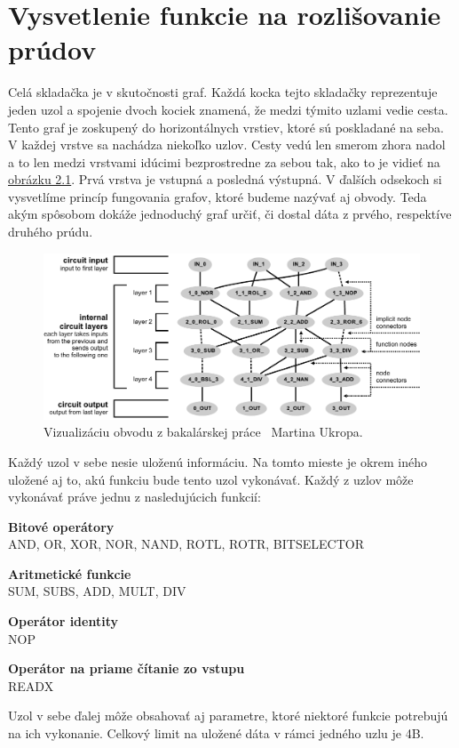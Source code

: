 \section{Vysvetlenie funkcie na rozlišovanie prúdov}
\label{sec:nodes}

Celá skladačka je v skutočnosti graf. Každá kocka tejto skladačky reprezentuje jeden uzol a spojenie dvoch kociek znamená, že medzi týmito uzlami vedie cesta. Tento graf je zoskupený do horizontálnych vrstiev, ktoré sú poskladané na seba. V každej vrstve sa nachádza niekoľko uzlov. Cesty vedú len smerom zhora nadol a to len medzi vrstvami idúcimi bezprostredne za sebou tak, ako to je vidieť na \hyperref[obr:circuit-example]{obrázku 2.1}. Prvá vrstva je vstupná a posledná výstupná. V ďalších odsekoch si vysvetlíme princíp fungovania grafov, ktoré budeme nazývať aj obvody. Teda akým spôsobom dokáže jednoduchý graf určiť, či dostal dáta z prvého, respektíve druhého prúdu. 

\begin{figure}[h!]
	\centering
	\includegraphics[scale=0.8]{./img/circuit-final.pdf}
	\caption{Vizualizáciu obvodu z {bakalárskej práce}~\parencite{ukrop-bc} Martina Ukropa.}
	\label{obr:circuit-example}
\end{figure} 

Každý uzol v sebe nesie uloženú informáciu. Na tomto mieste je okrem iného uložené aj to, akú funkciu bude tento uzol vykonávať. Každý z uzlov môže vykonávať práve jednu z nasledujúcich funkcií:
\begin{myItemize}
	\item \textbf{Bitové operátory}\\AND, OR, XOR, NOR, NAND, ROTL, ROTR, BITSELECTOR
	\item \textbf{Aritmetické funkcie}\\SUM, SUBS, ADD, MULT, DIV
	\item \textbf{Operátor identity}\\NOP
	\item \textbf{Operátor na priame čítanie zo vstupu}\\READX
\end{myItemize}
Uzol v sebe ďalej môže obsahovať aj parametre, ktoré niektoré funkcie potrebujú na ich vykonanie. Celkový limit na uložené dáta v rámci jedného uzlu je 4B.

